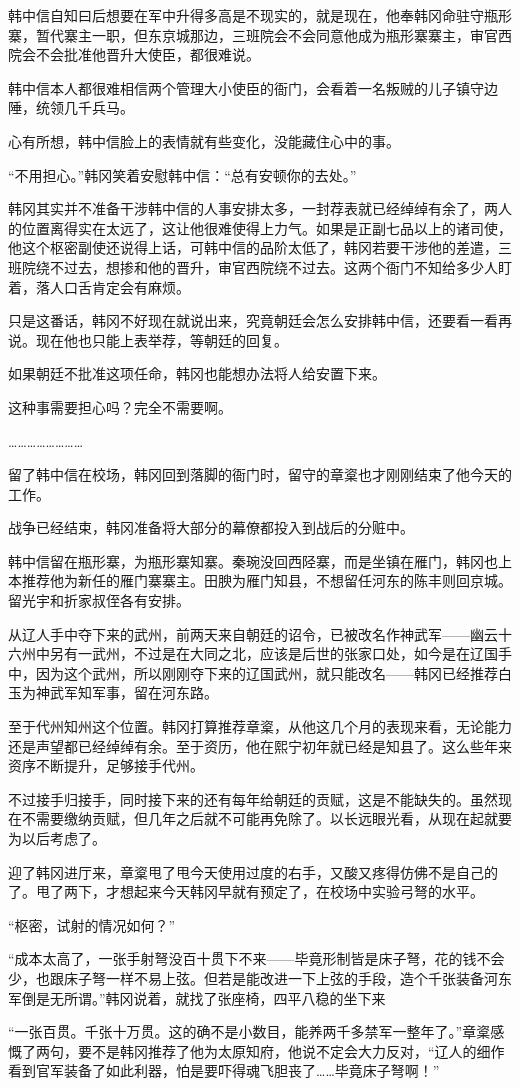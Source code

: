 韩中信自知曰后想要在军中升得多高是不现实的，就是现在，他奉韩冈命驻守瓶形寨，暂代寨主一职，但东京城那边，三班院会不会同意他成为瓶形寨寨主，审官西院会不会批准他晋升大使臣，都很难说。

韩中信本人都很难相信两个管理大小使臣的衙门，会看着一名叛贼的儿子镇守边陲，统领几千兵马。

心有所想，韩中信脸上的表情就有些变化，没能藏住心中的事。

“不用担心。”韩冈笑着安慰韩中信：“总有安顿你的去处。”

韩冈其实并不准备干涉韩中信的人事安排太多，一封荐表就已经绰绰有余了，两人的位置离得实在太远了，这让他很难使得上力气。如果是正副七品以上的诸司使，他这个枢密副使还说得上话，可韩中信的品阶太低了，韩冈若要干涉他的差遣，三班院绕不过去，想掺和他的晋升，审官西院绕不过去。这两个衙门不知给多少人盯着，落人口舌肯定会有麻烦。

只是这番话，韩冈不好现在就说出来，究竟朝廷会怎么安排韩中信，还要看一看再说。现在他也只能上表举荐，等朝廷的回复。

如果朝廷不批准这项任命，韩冈也能想办法将人给安置下来。

这种事需要担心吗？完全不需要啊。

……………………

留了韩中信在校场，韩冈回到落脚的衙门时，留守的章楶也才刚刚结束了他今天的工作。

战争已经结束，韩冈准备将大部分的幕僚都投入到战后的分赃中。

韩中信留在瓶形寨，为瓶形寨知寨。秦琬没回西陉寨，而是坐镇在雁门，韩冈也上本推荐他为新任的雁门寨寨主。田腴为雁门知县，不想留任河东的陈丰则回京城。留光宇和折家叔侄各有安排。

从辽人手中夺下来的武州，前两天来自朝廷的诏令，已被改名作神武军——幽云十六州中另有一武州，不过是在大同之北，应该是后世的张家口处，如今是在辽国手中，因为这个武州，所以刚刚夺下来的辽国武州，就只能改名——韩冈已经推荐白玉为神武军知军事，留在河东路。

至于代州知州这个位置。韩冈打算推荐章楶，从他这几个月的表现来看，无论能力还是声望都已经绰绰有余。至于资历，他在熙宁初年就已经是知县了。这么些年来资序不断提升，足够接手代州。

不过接手归接手，同时接下来的还有每年给朝廷的贡赋，这是不能缺失的。虽然现在不需要缴纳贡赋，但几年之后就不可能再免除了。以长远眼光看，从现在起就要为以后考虑了。

迎了韩冈进厅来，章楶甩了甩今天使用过度的右手，又酸又疼得仿佛不是自己的了。甩了两下，才想起来今天韩冈早就有预定了，在校场中实验弓弩的水平。

“枢密，试射的情况如何？”

“成本太高了，一张手射弩没百十贯下不来——毕竟形制皆是床子弩，花的钱不会少，也跟床子弩一样不易上弦。但若是能改进一下上弦的手段，造个千张装备河东军倒是无所谓。”韩冈说着，就找了张座椅，四平八稳的坐下来

“一张百贯。千张十万贯。这的确不是小数目，能养两千多禁军一整年了。”章楶感慨了两句，要不是韩冈推荐了他为太原知府，他说不定会大力反对，“辽人的细作看到官军装备了如此利器，怕是要吓得魂飞胆丧了……毕竟床子弩啊！”
